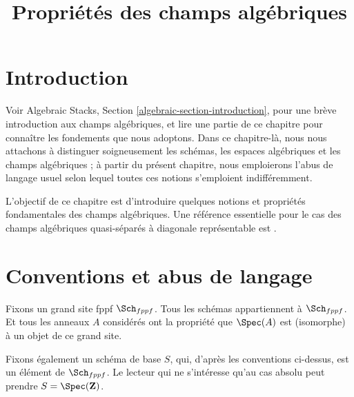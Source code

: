 

%


\title{Propriétés des champs algébriques}


\maketitle

\label{section-phantom}

\tableofcontents

\section{Introduction}
\label{section-introduction}

\noindent
Voir
Algebraic Stacks, Section \ref{algebraic-section-introduction},
pour une brève introduction aux champs algébriques, et lire
une partie de ce chapitre pour connaître les fondements que nous adoptons.
Dans ce chapitre-là, nous nous attachons à distinguer soigneusement
les schémas, les espaces algébriques et les champs algébriques ; à partir
du présent chapitre, nous emploierons l'abus de langage usuel selon lequel
toutes ces notions s'emploient indifféremment.

\medskip\noindent
L'objectif de ce chapitre est d'introduire quelques notions et
propriétés fondamentales des champs algébriques. Une référence
essentielle pour le cas des champs algébriques quasi-séparés à diagonale
représentable est \cite{LM-B}.



\section{Conventions et abus de langage}
\label{section-conventions}

\noindent
Fixons un grand site fppf $\Sch_{fppf}$.
Tous les schémas appartiennent à $\Sch_{fppf}$.
Et tous les anneaux $A$ considérés ont la propriété que
$\Spec(A)$ est (isomorphe) à un objet de ce grand site.

\medskip\noindent
Fixons également un schéma de base $S$, qui, d'après les conventions ci-dessus, est un élément
de $\Sch_{fppf}$. Le lecteur qui ne s'intéresse qu'au
cas absolu peut prendre $S = \Spec(\mathbf{Z})$.

